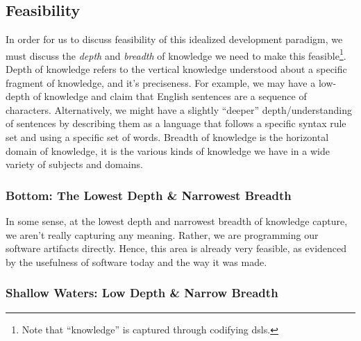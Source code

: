 \subsection{Feasibility}
\label{chap:ideology:sec:thoughts_of_generation:subsec:feasibility}

In order for us to discuss feasibility of this idealized development paradigm,
we must discuss the \textit{depth} and \textit{breadth} of knowledge we need to
make this feasible\footnote{Note that ``knowledge'' is captured through
codifying \acsp{dsl}.}. Depth of knowledge refers to the vertical knowledge
understood about a specific fragment of knowledge, and it's preciseness. For
example, we may have a low-depth of knowledge and claim that English sentences
are a sequence of characters. Alternatively, we might have a slightly ``deeper''
depth/understanding  of sentences by describing them as a language that follows
a specific syntax rule set and using a specific set of words. Breadth of
knowledge is the horizontal domain of knowledge, it is the various kinds of
knowledge we have in a wide variety of subjects and domains.

\subsubsection{Bottom: The Lowest Depth \& Narrowest Breadth}
\label{chap:ideology:sec:thoughts_of_generation:subsec:feasibility:subsubsec:bottom}

In some sense, at the lowest depth and narrowest breadth of knowledge capture,
we aren't really capturing any meaning. Rather, we are programming our software
artifacts directly. Hence, this area is already very feasible, as evidenced by
the usefulness of software today and the way it was made.

\subsubsection{Shallow Waters: Low Depth \& Narrow Breadth}
\label{chap:ideology:sec:thoughts_of_generation:subsec:feasibility:subsubsec:low}


